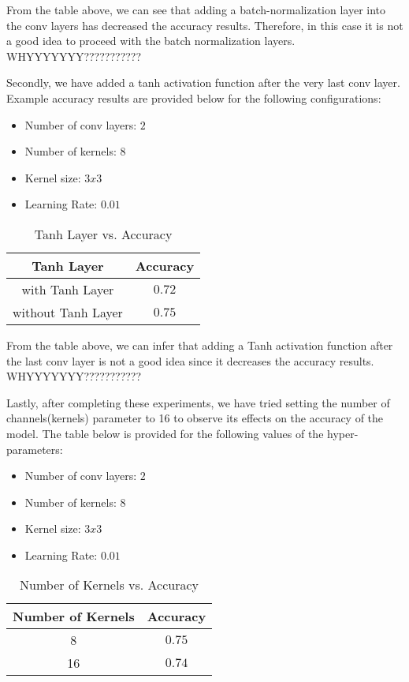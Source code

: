 \documentclass[12pt]{article}
\begin{document}
From the table above, we can see that adding a batch-normalization layer into the conv layers has decreased the accuracy results. Therefore, in this case it is not a good idea to proceed with the batch normalization layers. WHYYYYYYY???????????

Secondly, we have added a tanh activation function after the very last conv layer. Example accuracy results are provided below for the following configurations:

\begin{itemize}
	\item Number of conv layers: $2$
	\item Number of kernels: $8$
	\item Kernel size: $3x3$
	\item Learning Rate: $0.01$
\end{itemize}

\begin{table}[H]
\begin{center}
\caption{Tanh Layer vs. Accuracy}
\begin{tabular}{|c|c|}
\hline
 Tanh Layer & Accuracy \\
\hline
with Tanh Layer & $0.72$ \\
\hline
without Tanh Layer & $0.75$ \\
\hline
\end{tabular}
\end{center}
\end{table} 

From the table above, we can infer that adding a Tanh activation function after the last conv layer is not a good idea since it decreases the accuracy results.
WHYYYYYYY???????????

Lastly, after completing these experiments, we have tried setting the number of channels(kernels) parameter to 16 to observe its effects on the accuracy of the model. The table below is provided for the following values of the hyper-parameters:

\begin{itemize}
	\item Number of conv layers: $2$
	\item Number of kernels: $8$
	\item Kernel size: $3x3$
	\item Learning Rate: $0.01$
\end{itemize}

\begin{table}[H]
\begin{center}
\caption{Number of Kernels vs. Accuracy}
\begin{tabular}{|c|c|}
\hline
 Number of Kernels & Accuracy \\
\hline
8 & $0.75$ \\
\hline
16 & $0.74$ \\
\hline
\end{tabular}
\end{center}
\end{table} 
\end{document}
